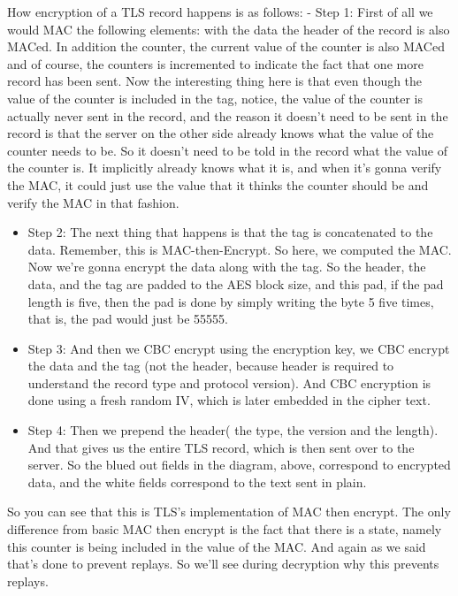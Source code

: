 \documentclass[11pt]{article}
\begin{document}
How encryption of a TLS record happens is as follows: - Step 1: First of
all we would MAC the following elements: with the data the header of the
record is also MACed. In addition the counter, the current value of the
counter is also MACed and of course, the counters is incremented to
indicate the fact that one more record has been sent. Now the
interesting thing here is that even though the value of the counter is
included in the tag, notice, the value of the counter is actually never
sent in the record, and the reason it doesn't need to be sent in the
record is that the server on the other side already knows what the value
of the counter needs to be. So it doesn't need to be told in the record
what the value of the counter is. It implicitly already knows what it
is, and when it's gonna verify the MAC, it could just use the value that
it thinks the counter should be and verify the MAC in that fashion.

\begin{itemize}
\item
  Step 2: The next thing that happens is that the tag is concatenated to
  the data. Remember, this is MAC-then-Encrypt. So here, we computed the
  MAC. Now we're gonna encrypt the data along with the tag. So the
  header, the data, and the tag are padded to the AES block size, and
  this pad, if the pad length is five, then the pad is done by simply
  writing the byte 5 five times, that is, the pad would just be 55555.
\item
  Step 3: And then we CBC encrypt using the encryption key, we CBC
  encrypt the data and the tag (not the header, because header is
  required to understand the record type and protocol version). And CBC
  encryption is done using a fresh random IV, which is later embedded in
  the cipher text. 
\item
  Step 4: Then we prepend the header( the type, the version and the
  length). And that gives us the entire TLS record, which is then sent
  over to the server. So the blued out fields in the diagram, above,
  correspond to encrypted data, and the white fields correspond to the
  text sent in plain.
\end{itemize}

So you can see that this is TLS's implementation of MAC then encrypt.
The only difference from basic MAC then encrypt is the fact that there
is a state, namely this counter is being included in the value of the
MAC. And again as we said that's done to prevent replays. So we'll see
during decryption why this prevents replays.
\end{document}
